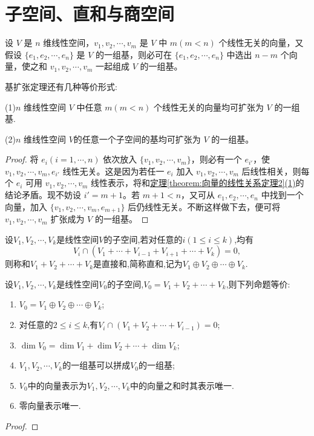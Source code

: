 \documentclass[../../main.tex]{subfiles}
\begin{document}
\section{子空间、直和与商空间}

\begin{theorem}[基扩张定理]\label{theorem:基扩张定理}
设 $V$ 是 $n$ 维线性空间，$v_1, v_2, \cdots, v_m$ 是 $V$ 中 $m (m < n)$ 个线性无关的向量，又假设 $\{e_1, e_2, \cdots, e_n\}$ 是 $V$ 的一组基，则必可在 $\{e_1, e_2, \cdots, e_n\}$ 中选出 $n - m$ 个向量，使之和 $v_1, v_2, \cdots, v_m$ 一起组成 $V$ 的一组基。

基扩张定理还有几种等价形式:

(1)$n$ 维线性空间 $V$ 中任意 $m (m < n)$ 个线性无关的向量均可扩张为 $V$ 的一组基.

(2)$n$ 维线性空间 $V$的任意一个子空间的基均可扩张为 $V$ 的一组基。
\end{theorem}
\begin{proof}
将 $e_i (i = 1, \cdots, n)$ 依次放入 $\{v_1, v_2, \cdots, v_m\}$，则必有一个 $e_{i'}$，使 $v_1, v_2, \cdots, v_m, e_{i'}$ 线性无关。这是因为若任一 $e_i$ 加入 $v_1, v_2, \cdots, v_m$ 后线性相关，则每个 $e_i$ 可用 $v_1, v_2, \cdots, v_m$ 线性表示，将和\hyperref[theorem:向量的线性关系定理2]{定理\ref{theorem:向量的线性关系定理2}(1)}的结论矛盾。现不妨设 $i' = m + 1$。若 $m + 1 < n$，又可从 $e_1, e_2, \cdots, e_n$ 中找到一个向量，加入 $\{v_1, v_2, \cdots, v_m, e_{m + 1}\}$ 后仍线性无关。不断这样做下去，便可将 $v_1, v_2, \cdots, v_m$ 扩张成为 $V$ 的一组基。
\end{proof}

\begin{definition}[直和]\label{definition:直和}
设\(V_1,V_2,\cdots,V_k\)是线性空间\(V\)的子空间,若对任意的\(i(1\leq i\leq k)\),均有
\[
V_i\cap(V_1+\cdots+V_{i - 1}+V_{i + 1}+\cdots+V_k)=0,
\]
则称和\(V_1 + V_2+\cdots+V_k\)是直接和,简称直和,记为\(V_1\oplus V_2\oplus\cdots\oplus V_k\).
\end{definition}

\begin{theorem}[直和的等价条件]\label{theorem:直和的等价条件}
设\(V_1,V_2,\cdots,V_k\)是线性空间\(V_0\)的子空间,\(V_0 = V_1 + V_2+\cdots+V_k\),则下列命题等价:
\begin{enumerate}[(1)]
\item \label{theorem:直和的等价条件1}\(V_0 = V_1\oplus V_2\oplus\cdots\oplus V_k\);
\item \label{theorem:直和的等价条件2}对任意的\(2\leq i\leq k\),有\(V_i\cap(V_1 + V_2+\cdots+V_{i - 1}) = 0\);
\item \label{theorem:直和的等价条件3}\(\dim V_0=\dim V_1+\dim V_2+\cdots+\dim V_k\);
\item \label{theorem:直和的等价条件4}\(V_1,V_2,\cdots,V_k\)的一组基可以拼成\(V_0\)的一组基;
\item \label{theorem:直和的等价条件5}\(V_0\)中的向量表示为\(V_1,V_2,\cdots,V_k\)中的向量之和时其表示唯一.
\item 零向量表示唯一.
\end{enumerate}
\end{theorem}
\begin{proof}

\end{proof} 
\end{document}
